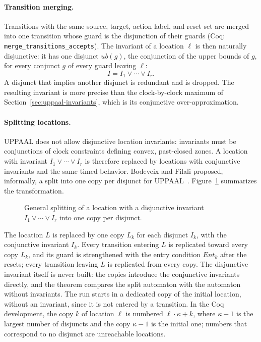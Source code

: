\paragraph{Transition merging.}
Transitions with the same source, target, action label, and reset set are
merged into one transition whose guard is the disjunction of their guards (Coq:
\texttt{merge\_\allowbreak{}transitions\_\allowbreak{}accepts}).  The invariant of a location
$\ell$ is then naturally disjunctive: it has one disjunct
$\mathit{ub}(g)$, the conjunction of the upper bounds of $g$, for every
conjunct $g$ of every guard leaving $\ell$:
\[
  I = I_1 \lor \cdots \lor I_r.
\]
A disjunct that implies another disjunct is redundant and is dropped.  The
resulting invariant is more precise than the clock-by-clock maximum of
Section~\ref{sec:uppaal-invariants}, which is its conjunctive
over-approximation.

\paragraph{Splitting locations.}
UPPAAL does not allow disjunctive location invariants: invariants must be
conjunctions of clock constraints defining convex, past-closed zones.  A
location with invariant $I_1\lor\cdots\lor I_r$ is therefore replaced by
locations with conjunctive invariants and the same timed behavior.  Bodeveix
and Filali proposed, informally, a split into one copy per disjunct for
UPPAAL~\cite{[BF03]}.
Figure~\ref{fig:disj-general} summarizes the transformation.

\begin{figure}[t]
\centering
\resizebox{\columnwidth}{!}{}
\caption{General splitting of a location with a disjunctive invariant
$I_1\lor\cdots\lor I_r$ into one copy per disjunct.}
\label{fig:disj-general}
\end{figure}

The location $L$ is replaced by one copy $L_k$ for each disjunct $I_k$, with
the conjunctive invariant $I_k$.  Every transition entering $L$ is replicated
toward every copy $L_k$, and its guard is strengthened with the entry condition
$\mathit{Ent}_k$ after the resets; every transition leaving $L$ is replicated from every
copy.  The disjunctive invariant itself is never built: the copies introduce
the conjunctive invariants directly, and the theorem compares the split
automaton with the automaton without invariants.  The run starts in a dedicated
copy of the initial location, without an invariant, since it is not entered by a
transition.  In the Coq development, the copy $k$ of location $\ell$ is numbered
$\ell\cdot\kappa+k$, where $\kappa-1$ is the largest number of disjuncts and the copy
$\kappa-1$ is the initial one; numbers that correspond to no disjunct are unreachable
locations.

